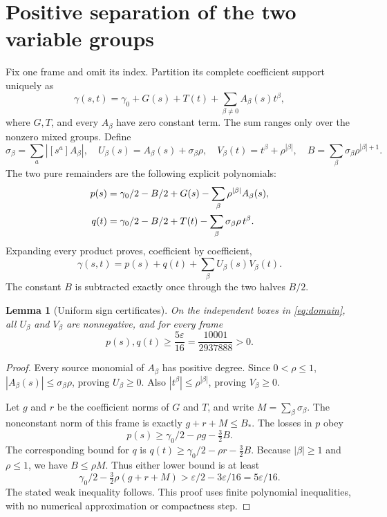 \documentclass[11pt]{article}
\newcommand{\eps}{\varepsilon}
\newtheorem{lemma}[theorem]{Lemma}
\theoremstyle{definition}
\begin{document}
\section{Positive separation of the two variable groups}

Fix one frame and omit its index. Partition its complete coefficient support
uniquely as
\begin{equation}
 \gamma(s,t)=\gamma_0+G(s)+T(t)
              +\sum_{\beta\ne0}A_\beta(s)t^\beta,
 \label{eq:grouping}
\end{equation}
where $G,T$, and every $A_\beta$ have zero constant term. The sum ranges only
over the nonzero mixed groups. Define
\begin{equation}
 \sigma_\beta=\sum_a|[s^a]A_\beta|,\quad
 U_\beta(s)=A_\beta(s)+\sigma_\beta\rho,\quad
 V_\beta(t)=t^\beta+\rho^{|\beta|},\quad
 B=\sum_\beta\sigma_\beta\rho^{|\beta|+1}.
 \label{eq:shifts}
\end{equation}
The two pure remainders are the following explicit polynomials:
\begin{align}
 p(s)&=\gamma_0/2-B/2+G(s)
                -\sum_\beta\rho^{|\beta|}A_\beta(s),\notag\\
 q(t)&=\gamma_0/2-B/2+T(t)
                -\sum_\beta\sigma_\beta\rho\,t^\beta.
 \label{eq:remainders}
\end{align}
Expanding every product proves, coefficient by coefficient,
\begin{equation}
 \gamma(s,t)=p(s)+q(t)+\sum_\beta U_\beta(s)V_\beta(t).
 \label{eq:separation}
\end{equation}
The constant $B$ is subtracted exactly once through the two halves $B/2$.

\begin{lemma}[Uniform sign certificates]\label{lem:sign}
On the independent boxes in \eqref{eq:domain}, all $U_\beta$ and $V_\beta$
are nonnegative, and for every frame
\begin{equation}
 p(s),q(t)\geq\frac{5\eps}{16}
              =\frac{10001}{2937888}>0.
 \label{eq:remainderbound}
\end{equation}
\end{lemma}
\begin{proof}
Every source monomial of $A_\beta$ has positive degree. Since $0<\rho\leq1$,
$|A_\beta(s)|\leq\sigma_\beta\rho$, proving $U_\beta\geq0$. Also
$|t^\beta|\leq\rho^{|\beta|}$, proving $V_\beta\geq0$.

Let $g$ and $r$ be the coefficient norms of $G$ and $T$, and write
$M=\sum_\beta\sigma_\beta$. The nonconstant norm of this frame is exactly
$g+r+M\leq B_*$. The losses in $p$ obey
\[
 p(s)\geq\gamma_0/2-\rho g-\tfrac32 B.
\]
The corresponding bound for $q$ is
$q(t)\geq\gamma_0/2-\rho r-\tfrac32B$. Because $|\beta|\geq1$ and
$\rho\leq1$, we have $B\leq\rho M$. Thus either lower bound is at least
\[
 \gamma_0/2-\tfrac32\rho(g+r+M)
 >\eps/2-3\eps/16=5\eps/16.
\]
The stated weak inequality follows. This proof uses finite polynomial
inequalities, with no numerical approximation or compactness step.
\end{proof}
\end{document}

